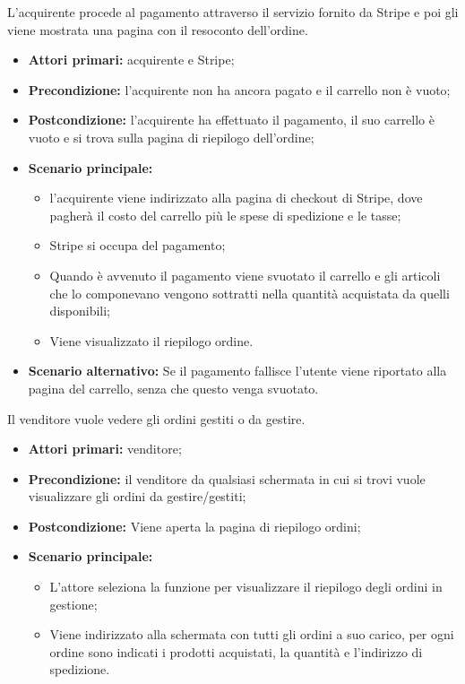 L'acquirente procede al pagamento attraverso il servizio fornito da Stripe e poi gli viene mostrata una pagina con il resoconto dell'ordine.
\begin{itemize}
    \item \textbf{Attori primari:} acquirente e Stripe;
    \item \textbf{Precondizione:} l'acquirente non ha ancora pagato e il carrello non è vuoto;
    \item \textbf{Postcondizione:} l'acquirente ha effettuato il pagamento, il suo carrello è vuoto e si trova sulla pagina di riepilogo dell'ordine;
    \item \textbf{Scenario principale:}
        \begin{itemize}
            \item l'acquirente viene indirizzato alla pagina di checkout di Stripe, dove pagherà il costo del carrello più le spese di spedizione e le tasse;
            \item Stripe si occupa del pagamento;
            \item Quando è avvenuto il pagamento viene svuotato il carrello e gli articoli che lo componevano vengono sottratti nella quantità acquistata da quelli disponibili;
            \item Viene visualizzato il riepilogo ordine.
        \end{itemize}
    \item \textbf{Scenario alternativo:} Se il pagamento fallisce l'utente viene riportato alla pagina del carrello, senza che questo venga svuotato.
\end{itemize}

Il venditore vuole vedere gli ordini gestiti o da gestire.
\begin{itemize}
    \item \textbf{Attori primari:} venditore;
    \item \textbf{Precondizione:} il venditore da qualsiasi schermata in cui si trovi vuole visualizzare gli ordini da gestire/gestiti;
    \item \textbf{Postcondizione:} Viene aperta la pagina di riepilogo ordini;
    \item \textbf{Scenario principale:}
    \begin{itemize}
        \item L'attore seleziona la funzione per visualizzare il riepilogo degli ordini in gestione;
        \item Viene indirizzato alla schermata con tutti gli ordini a suo carico, per ogni ordine sono indicati i prodotti acquistati, la quantità e l'indirizzo di spedizione.
    \end{itemize}
\end{itemize}

